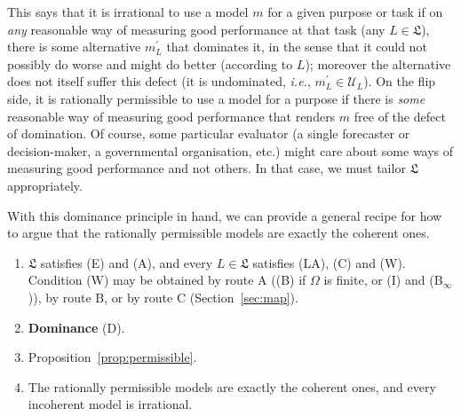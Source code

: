 \documentclass[11pt]{article}
\theoremstyle{definition}
\theoremstyle{remark}
\newcommand{\U}{\mathcal U}
\begin{document}
This says that it is irrational to use a model $m$ for a given purpose or task if on \textit{any} reasonable way of measuring good performance at that task (any $L\in\mathfrak L$), there is some alternative $m_L^\prime$ that dominates it, in the sense that it could not possibly do worse and might do better (according to $L$); moreover the alternative does not itself suffer this defect (it is undominated, \textit{i.e.}, $m_L^\prime\in\U_L$). On the flip side, it is rationally permissible to use a model for a purpose if there is \textit{some} reasonable way of measuring good performance that renders $m$ free of the defect of domination. Of course, some particular evaluator (a single forecaster or decision-maker, a governmental organisation, etc.) might care about some ways of measuring good performance and not others. In that case, we must tailor $\mathfrak L$ appropriately.

With this dominance principle in hand, we can provide a general recipe for how to argue that the rationally permissible models are exactly the coherent ones.
\begin{enumerate}[label=\textbf{(P\arabic*)},leftmargin=*]
\item $\mathfrak L$ satisfies (E) and (A), and every $L\in\mathfrak L$ satisfies (LA), (C) and (W). Condition (W) may be obtained by route A ((B) if $\Omega$ is finite, or (I) and (B$_\infty$)), by route B, or by route C (Section~\ref{sec:map}).
\item \textbf{Dominance} (D).
\item Proposition~\ref{prop:permissible}.
\item[\textbf{(P4)}] The rationally permissible models are exactly the coherent ones, and every incoherent model is irrational.
\end{enumerate}
\end{document}
